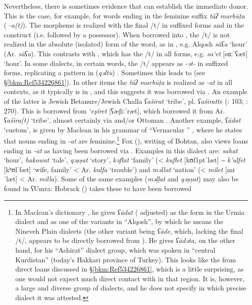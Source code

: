 \documentclass[output=paper]{langsci/langscibook}
\begin{document}
Nevertheless, there is sometimes evidence that can establish the immediate donor. This is the case, for example, for  words ending in the feminine suffix \textit{tāʔ} \textit{marbūṭa} (  \textit{{}-a(t)}). The  morpheme is realized with the final /t/ in suffixed forms and in the construct (i.e. followed by a possessor). When borrowed into , the /t/ is not realized in the absolute (isolated) form of the word, as in , e.g. Alqosh \textit{sāʕa} ‘hour’ (Ar. \textit{sāʕa}). This contrasts with , which has the /t/ in all forms, e.g.  \textit{sa‘et} [sɑːˈʕæt] ‘hour’. In some  dialects, in certain words, the /t/ appears as \textit{{}-ət-} in suffixed forms, replicating a pattern in (\textit{qəltu}) . Sometimes this leads to  (see §\ref{bkm:Ref534226861}). In other items the \textit{tāʔ} \textit{marbūṭa} is realized as \textit{{}-at} in all contexts, as it typically is in , and this suggests it was borrowed via . An example of the latter is Jewish Betanure/Jewish Challa \textit{ʕaširat} ‘tribe’, pl. \textit{ʕaširatte} (\citealt{Mutzafi2008}: 103; \citealt{Fassberg2010}: 270). This is borrowed from   \textit{‘eşîret} [ʕæʃiːˈræt], which borrowed it from Ar. \textit{ʕašīra(t)} ‘tribe’, almost certainly via  and/or Ottoman . Another example, \textit{ʕādat} ‘custom’, is given by Maclean in his grammar of ``Vernacular '' \citep[35]{Maclean1895}, where he states that nouns ending in \textit{\nobreakdash-at} are feminine.\footnote{\textrm{In Maclean’s dictionary} \textrm{\citep[235]{Maclean1901}, he gives} \textrm{\textit{ʕādat} }\textrm{( adjusted)}\textrm{ }\textrm{as the form in the  Urmia dialect and as one of the variants in ``Alqosh'', by which he means the Nineveh Plain dialects (the other variant being} \textrm{\textit{ʕāde}}\textrm{, which, lacking the final /t/, appears to be directly borrowed from ). He gives} \textrm{\textit{ʕādəta,}} \textrm{on the other hand, for his ``Ashirat'' dialect group, which was spoken in ``central Kurdistan'' (today’s Hakkari province of Turkey). This looks like the  from direct  loans discussed in §\ref{bkm:Ref534226861}, which is a little surprising, as one would not expect much direct contact with  in that region. It is, however, a large and diverse group of dialects, and he does not specify in which precise dialect it was attested.}} Fox (\citeyear[91]{Fox2009}), writing of  Bohtan, also views  loans ending in \textit{{}-at} as having been borrowed via . Examples in this dialect are: \textit{sahat} ‘hour’, \textit{hakowat} ‘tale’, \textit{qəṣṣat} ‘story’, \textit{kəflat} ‘family’ (<  \textit{kuflet} [kʊf\kern 1ptˈlæt] \textit{{\textasciitilde} k’ulfet} [kʰʊlˈfæt] ‘wife, family’ < Ar. \textit{kulfa} ‘trouble’) and \textit{məllat} ‘nation’ (<  \textit{milet} [mɪˈlæt] < Ar. \textit{milla}). Some of the same examples (\textit{məḷḷat} and \textit{qəṣṣat}) may also be found in  ʕUmra: Hobrack (\citeyear[108]{Hobrack2000}) takes these to have been borrowed 
\end{document}
